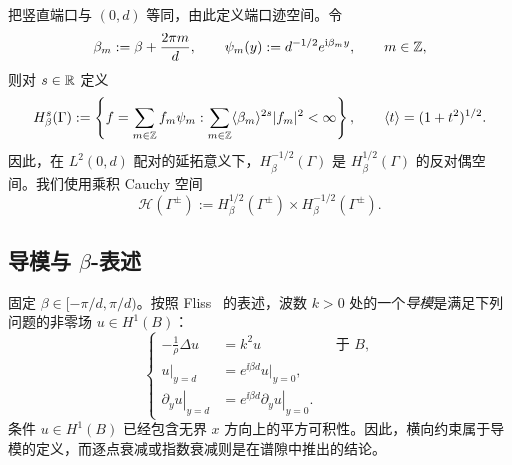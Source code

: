 把竖直端口与 $(0,d)$ 等同，由此定义端口迹空间。令
\[
  \beta_m:=\beta+\frac{2\pi m}{d},\qquad
  \psi_m(y):=d^{-1/2}e^{\mathrm{i}\beta_my},\qquad m\in\mathbb{Z},
\]
则对 $s\in\mathbb{R}$ 定义
\begin{equation}
  H^s_\beta(\Gamma):=
  \left\{f=\sum_{m\in\mathbb{Z}}f_m\psi_m:
  \sum_{m\in\mathbb{Z}}\langle\beta_m\rangle^{2s}|f_m|^2<\infty\right\},
  \qquad \langle t\rangle=(1+t^2)^{1/2}.
  \label{eq:port-Sobolev}
\end{equation}
因此，在 $L^2(0,d)$ 配对的延拓意义下，$H^{-1/2}_\beta(\Gamma)$ 是 $H^{1/2}_\beta(\Gamma)$ 的反对偶空间。我们使用乘积 Cauchy 空间
\begin{equation}
  \mathcal H(\Gamma^\pm)
  :=H^{1/2}_\beta(\Gamma^\pm)\times H^{-1/2}_\beta(\Gamma^\pm).
  \label{eq:Cauchy-space}
\end{equation}

\subsection{导模与 \texorpdfstring{$\beta$}{beta}-表述}

固定 $\beta\in[-\pi/d,\pi/d)$。按照 Fliss~\cite[(2.4)]{Fliss2013} 的表述，波数 $k>0$ 处的一个\emph{导模}是满足下列问题的非零场 $u\in H^1(B)$：
\begin{equation}
  \left\{
  \begin{aligned}
    -\frac{1}{\rho}\Delta u&=k^2u&&\text{于 }B,\\
    \left.u\right|_{y=d}
      &=e^{\ii\beta d}\left.u\right|_{y=0},\\
    \left.\partial_yu\right|_{y=d}
      &=e^{\ii\beta d}\left.\partial_yu\right|_{y=0}.
  \end{aligned}
  \right.
  \label{eq:guided-mode-Fliss}
\end{equation}
条件 $u\in H^1(B)$ 已经包含无界 $x$ 方向上的平方可积性。因此，横向约束属于导模的定义，而逐点衰减或指数衰减则是在谱隙中推出的结论。

